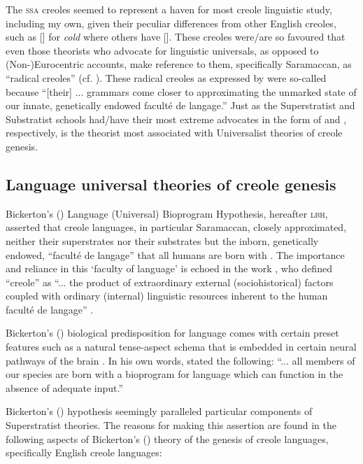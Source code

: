 The \textsc{ssa} creoles seemed to represent a haven for most creole linguistic study, including my own, given their peculiar differences from other English creoles, such as [] for \textit{cold} where others have []. These creoles were/are so favoured that even those theorists who advocate for linguistic universals, as opposed to (Non-)Eurocentric accounts, make reference to them, specifically Saramaccan, as ``radical creoles'' (cf. \citealt{Bickerton77, Bickerton81, Bickerton84, Bickerton99}). These radical creoles as expressed by  \citet[3]{Byrne87} were so-called because ``[their] ... grammars come closer to approximating the unmarked state of our innate, genetically endowed facult\'{e} de langage.'' Just as the Superstratist and Substratist schools had/have their most extreme advocates in the form of \citet{Chaudenson01} and  \citet{Alleyne80}, respectively,  \citet{Bickerton77, Bickerton81, Bickerton84, Bickerton99} is the theorist most associated with Universalist theories of creole genesis.

\subsection {Language universal theories of creole genesis} \label{2.2.3}
Bickerton's (\citeyear{Bickerton77, Bickerton81, Bickerton84, Bickerton99}) Language (Universal) Bioprogram Hypothesis, hereafter \textsc{lbh}, asserted that creole languages, in particular Saramaccan, closely approximated, neither their superstrates nor their substrates but the inborn, genetically endowed, ``facult\'{e} de langage'' that all humans are born with \citep[158]{Bickerton84}. The importance and reliance in this `faculty of language' is echoed in the work \citet{DeGraff01}, who defined ``creole'' as ``... the product of extraordinary external (sociohistorical) factors coupled with ordinary (internal) linguistic resources inherent to the human facult\'{e} de langage'' \citep[11]{DeGraff01}.

Bickerton's (\citeyear{Bickerton77, Bickerton81, Bickerton84, Bickerton99}) biological predisposition for language comes with certain preset features such as a natural tense-aspect schema that is embedded in certain neural pathways of the brain  \citep{Bickerton75}. In his own words,  \citet[2]{Bickerton81} stated the following: ``... all members of our species are born with a bioprogram for language which can function in the absence of adequate input.''

Bickerton's (\citeyear{Bickerton77, Bickerton81, Bickerton84, Bickerton99}) hypothesis seemingly paralleled particular components of Superstratist theories. The reasons for making this assertion are found in the following aspects of Bickerton's (\citeyear{Bickerton77, Bickerton81, Bickerton84, Bickerton99}) theory of the genesis of creole languages, specifically English creole languages:

